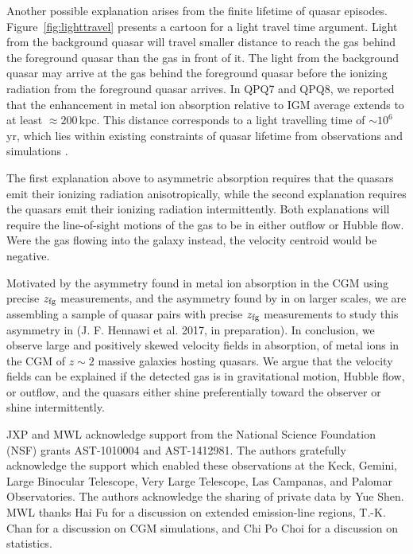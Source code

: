 \documentclass[iop]{emulateapj}
\begin{document}
Another possible explanation arises from the finite lifetime of quasar episodes. 
Figure~\ref{fig:lighttravel} presents a cartoon for a light travel time argument. Light from the 
background quasar will travel smaller distance to reach the gas behind the foreground quasar 
than the gas in front of it. The light from the background quasar may arrive at the gas behind 
the foreground quasar before the ionizing radiation from the foreground quasar arrives. In 
QPQ7 and QPQ8, we reported that the enhancement in metal ion absorption relative to IGM average 
extends to at least $\approx200$\,kpc. This distance corresponds to a light travelling time of 
$\sim10^6$\,yr, which lies within existing constraints of quasar lifetime from observations 
\citep[e.g.][]{Martini04} and simulations \citep[e.g.][]{Hopkins+05}. 

The first explanation above to asymmetric
absorption requires that the quasars emit their ionizing radiation anisotropically, while the 
second explanation requires the quasars emit their ionizing radiation intermittently. Both 
explanations will require the line-of-sight motions of the gas to be in either outflow or Hubble 
flow. Were the gas flowing into the galaxy instead, the velocity centroid would be negative. 

Motivated by the asymmetry found in metal ion absorption in the CGM using precise $z_{\rm fg}$ 
measurements, and the asymmetry found by \cite{KirkmanTytler08} in  on larger 
scales, we are assembling a sample of quasar pairs with precise $z_{\rm fg}$ measurements to study 
this asymmetry in  (J. F. Hennawi et al. 2017, in preparation). In conclusion, we 
observe large and positively skewed velocity fields in absorption, of metal ions 
in the CGM of $z\sim2$ massive galaxies hosting quasars. We argue that the velocity fields can be 
explained if the detected gas is in gravitational motion, Hubble flow, or outflow, and the quasars 
either shine preferentially toward the observer or shine intermittently. 

\acknowledgements

JXP and MWL acknowledge support from the National Science Foundation (NSF) grants AST-1010004 and 
AST-1412981. The authors gratefully acknowledge the support which enabled these observations at 
the Keck, Gemini, Large Binocular Telescope, Very Large Telescope, Las Campanas, and Palomar 
Observatories. The authors acknowledge the sharing of private data by Yue Shen. MWL thanks Hai Fu
for a discussion on extended emission-line regions, T.-K. Chan for a discussion on CGM
simulations, and Chi Po Choi for a discussion on statistics.
\end{document}
